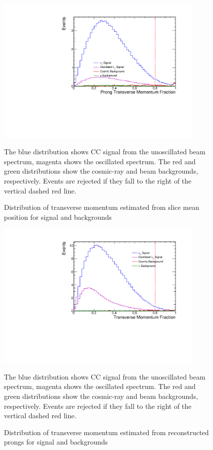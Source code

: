 \begin{figure}[t]
\begin{center}
\includegraphics[width=0.9\textwidth]{figures/selection/n1_pngptp.pdf}
\end{center}
\caption{Distribution of transverse momentum estimated from slice mean position
for signal and backgrounds}{
The blue distribution shows \numu CC signal from the unoscillated beam spectrum,
magenta shows the oscillated spectrum.
The red and green distributions show the cosmic-ray and beam backgrounds,
respectively.  Events are rejected if they fall to the right of the vertical
dashed red line.
}
\label{pngptp}
\end{figure}
\begin{figure}[t]
\begin{center}
\includegraphics[width=0.9\textwidth]{figures/selection/n1_tranMom.pdf}
\end{center}
\caption{Distribution of transverse momentum estimated from reconstructed prongs
 for signal and backgrounds}{
The blue distribution shows \numu CC signal from the unoscillated beam spectrum,
magenta shows the oscillated spectrum.
The red and green distributions show the cosmic-ray and beam backgrounds,
respectively.  Events are rejected if they fall to the right of the vertical
dashed red line.
}
\label{tranMom}
\end{figure}







